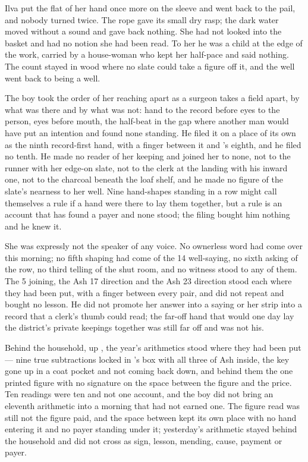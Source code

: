 Ilva put the flat of her hand once more on the sleeve and went back to the pail, and nobody turned twice. The rope gave its small dry rasp; the dark water moved without a sound and gave back nothing. She had not looked into the basket and had no notion she had been read. To her he was a child at the edge of the work, carried by a house-woman who kept her half-pace and said nothing. The count stayed in wood where no slate could take a figure off it, and the well went back to being a well.

\scenebreak

The boy took the order of her reaching apart as a surgeon takes a field apart, by what was there and by what was not: hand to the record before eyes to the person, eyes before mouth, the half-beat in the gap where another man would have put an intention and found none standing. He filed it on a place of its own as the ninth record-first hand, with a finger between it and 's eighth, and he filed no tenth. He made no reader of her keeping and joined her to none, not to the runner with her edge-on slate, not to the clerk at the landing with his inward one, not to the charcoal beneath the loaf shelf, and he made no figure of the slate's nearness to her well. Nine hand-shapes standing in a row might call themselves a rule if a hand were there to lay them together, but a rule is an account that has found a payer and none stood; the filing bought him nothing and he knew it.

She was expressly not the speaker of any voice. No ownerless word had come over  this morning; no fifth shaping had come of the  14 well-saying, no sixth asking of the row, no third telling of the shut room, and no witness stood to any of them. The  5 joining, the Ash 17 direction and the Ash 23 direction stood each where they had been put, with a finger between every pair, and did not repeat and bought no lesson. He did not promote her answer into a saying or her strip into a record that a clerk's thumb could read; the far-off hand that would one day lay the district's private keepings together was still far off and was not his.

Behind the household, up , the year's arithmetics stood where they had been put --- nine true subtractions locked in 's box with all three of Ash inside, the key gone up in a coat pocket and not coming back down, and behind them the one printed figure with no signature on the space between the figure and the price. Ten readings were ten and not one account, and the boy did not bring an eleventh arithmetic into a morning that had not earned one. The figure read was still not the figure paid, and the space between kept its own place with no hand entering it and no payer standing under it; yesterday's arithmetic stayed behind the household and did not cross as sign, lesson, mending, cause, payment or payer.

